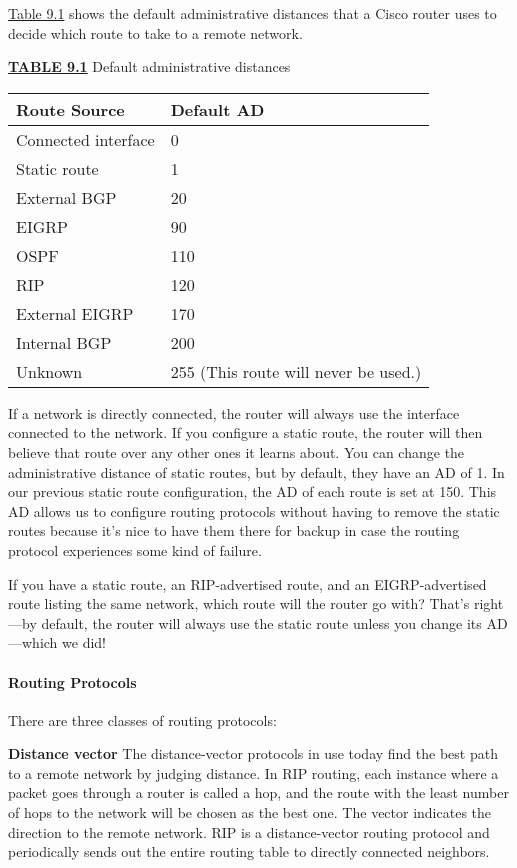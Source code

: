 \protect\hyperlink{c09.xhtmlux5cux23table9-1}{Table 9.1} shows the
default administrative distances that a Cisco router uses to decide
which route to take to a remote network.

{\protect\hyperlink{c09.xhtmlux5cux23tableanchor9-1}{\textbf{TABLE 9.1}}
Default administrative distances}

\begin{longtable}[]{@{}ll@{}}
\toprule
Route Source & Default AD\tabularnewline
\midrule
\endhead
Connected interface & 0\tabularnewline
Static route & 1\tabularnewline
External BGP & 20\tabularnewline
EIGRP & 90\tabularnewline
OSPF & 110\tabularnewline
RIP & 120\tabularnewline
External EIGRP & 170\tabularnewline
Internal BGP & 200\tabularnewline
Unknown & 255 (This route will never be used.)\tabularnewline
\bottomrule
\end{longtable}

If a network is directly connected, the router will always use the
interface connected to the network. If you configure a static route, the
router will then believe that route over any other ones it learns about.
You can change the administrative distance of static routes, but by
default, they have an AD of 1. In our previous static route
configuration, the AD of each route is set at 150. This AD allows us to
configure routing protocols without having to remove the static routes
because it's nice to have them there for backup in case the routing
protocol experiences some kind of failure.

\protect\hypertarget{c09.xhtmlux5cux23Page_392}{}{}If you have a static
route, an RIP-advertised route, and an EIGRP-advertised route listing
the same network, which route will the router go with? That's right---by
default, the router will always use the static route unless you change
its AD---which we did!

\paragraph{Routing Protocols}

There are three classes of routing protocols:

\textbf{Distance vector} The distance-vector protocols in use today find
the best path to a remote network by judging distance. In RIP routing,
each instance where a packet goes through a router is called a hop, and
the route with the least number of hops to the network will be chosen as
the best one. The vector indicates the direction to the remote network.
RIP is a distance-vector routing protocol and periodically sends out the
entire routing table to directly connected neighbors.

